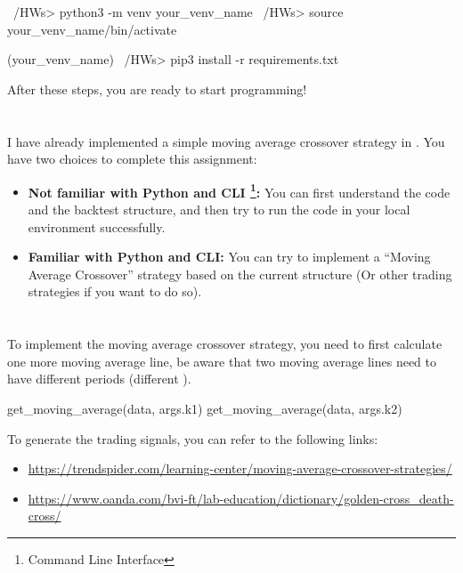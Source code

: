 \documentclass[a4paper, 12pt]{article}
\begin{document}
\begin{python}
~/HWs> python3 -m venv your_venv_name
~/HWs> source your_venv_name/bin/activate

(your_venv_name) ~/HWs> pip3 install -r requirements.txt
\end{python}

\noindent After these steps, you are ready to start programming!

\section*{}

I have already implemented a simple moving average crossover
strategy in . You have two choices to
complete this assignment:

\begin{itemize}
    \item \textbf{Not familiar with Python and CLI \footnote{Command Line Interface}:}
        You can first understand the code and the backtest structure, and then try
        to run the code in your local environment successfully.
    \item \textbf{Familiar with Python and CLI:}
        You can try to implement a ``Moving Average Crossover'' strategy based on
        the current structure (Or other trading strategies if you want to do so).
\end{itemize}

\section*{}

\subsection*{}

To implement the moving average crossover strategy, you need to
first calculate one more moving average line, be aware that two
moving average lines need to have different periods (different ).

\begin{python}
get_moving_average(data, args.k1)
get_moving_average(data, args.k2)
\end{python}

\noindent To generate the trading signals, you can refer to the following links:
\begin{itemize}
    \item \url{https://trendspider.com/learning-center/moving-average-crossover-strategies/}
    \item \url{https://www.oanda.com/bvi-ft/lab-education/dictionary/golden-cross_death-cross/}
\end{itemize}
\end{document}
